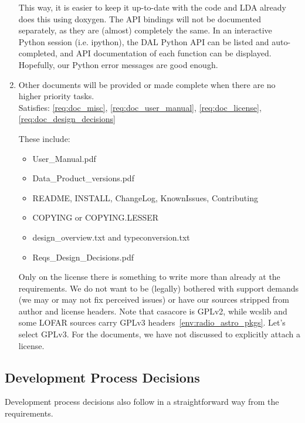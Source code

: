\documentclass[a4paper,11pt]{article}
\begin{document}
\begin{enumerate}[resume, label=\it D.\arabic{*}]
This way, it is easier to keep it up-to-date with the code and LDA already does this using doxygen.
The API bindings will not be documented separately, as they are (almost) completely the same.
In an interactive Python session (i.e. ipython), the DAL Python API can be listed and auto-completed, and API documentation of each function can be displayed.
Hopefully, our Python error messages are good enough.

\item \label{dsg:other_docs} Other documents will be provided or made complete when there are no higher priority tasks.\\
Satisfies: \ref{req:doc_misc}, \ref{req:doc_user_manual}, \ref{req:doc_license}, \ref{req:doc_design_decisions}

These include:
\begin{itemize}
\itemsep0em
\item User\_Manual.pdf
\item Data\_Product\_versions.pdf
\item README, INSTALL, ChangeLog, KnownIssues, Contributing
\item COPYING or COPYING.LESSER
\item design\_overview.txt and typeconversion.txt
\item Reqs\_Design\_Decisions.pdf
\end{itemize}
Only on the license there is something to write more than already at the requirements.
We do not want to be (legally) bothered with support demands (we may or may not fix perceived issues) or have our sources stripped from author and license headers.
Note that casacore is GPLv2, while wcslib and some LOFAR sources carry GPLv3 headers~\ref{env:radio_astro_pkgs}.
Let's select GPLv3.
For the documents, we have not discussed to explicitly attach a license.

\end{enumerate}


\subsection{Development Process Decisions} \label{sec:dev_process_decisions}
Development process decisions also follow in a straightforward way from the requirements.
\end{document}
